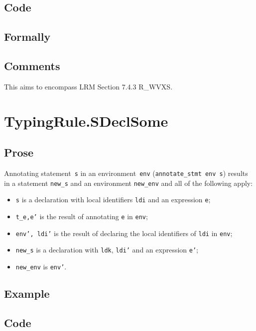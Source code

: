 \documentclass{book}
\begin{document}
  \subsection{Code}

\begin{emptyformal}
    \subsection{Formally}
\end{emptyformal}

\subsection{Comments}
    This aims to encompass LRM Section 7.4.3 R\_WVXS.

\section{TypingRule.SDeclSome \label{sec:TypingRule.SDeclSome}}

  \subsection{Prose}
Annotating statement~\texttt{s} in an environment~\texttt{env}
(\texttt{annotate\_stmt env s}) results in a statement \texttt{new\_s} and an
environment \texttt{new\_env} and all of the following apply:
   \begin{itemize}
   \item \texttt{s} is a declaration with local identifiers \texttt{ldi} and an expression \texttt{e};
   \item \texttt{t\_e,e'} is the result of annotating \texttt{e} in \texttt{env};
   \item \texttt{env', ldi'} is the result of declaring the local identifiers of \texttt{ldi} in \texttt{env};
   \item \texttt{new\_s} is a declaration with \texttt{ldk}, \texttt{ldi'} and an expression \texttt{e'};
   \item \texttt{new\_env} is \texttt{env'}.
   \end{itemize}

  \subsection{Example}

  \subsection{Code}
\end{document}
